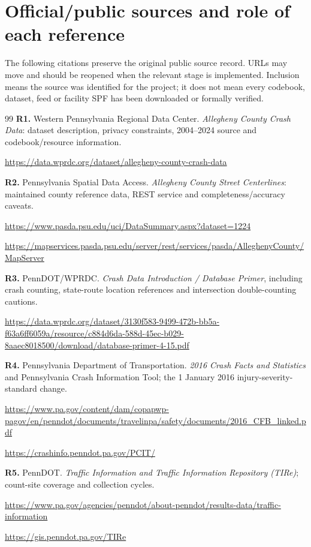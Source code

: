 \documentclass[11pt,a4paper,openany]{report}
\begin{document}
\section{Official/public sources and role of each reference}
The following citations preserve the original public source record. URLs may move and should be reopened when the relevant stage is implemented. Inclusion means the source was identified for the project; it does not mean every codebook, dataset, feed or facility SPF has been downloaded or formally verified.

\begin{thebibliography}{99}
\textbf{R1.} Western Pennsylvania Regional Data Center. \emph{Allegheny County Crash Data}: dataset description, privacy constraints, 2004--2024 source and codebook/resource information.\par\url{https://data.wprdc.org/dataset/allegheny-county-crash-data}

\textbf{R2.} Pennsylvania Spatial Data Access. \emph{Allegheny County Street Centerlines}: maintained county reference data, REST service and completeness/accuracy caveats.\par\url{https://www.pasda.psu.edu/uci/DataSummary.aspx?dataset=1224}\par\url{https://mapservices.pasda.psu.edu/server/rest/services/pasda/AlleghenyCounty/MapServer}

\textbf{R3.} PennDOT/WPRDC. \emph{Crash Data Introduction / Database Primer}, including crash counting, state-route location references and intersection double-counting cautions.\par\url{https://data.wprdc.org/dataset/3130f583-9499-472b-bb5a-f63a6ff6059a/resource/c884d6da-588d-45ec-b029-8aaec8018500/download/database-primer-4-15.pdf}

\textbf{R4.} Pennsylvania Department of Transportation. \emph{2016 Crash Facts and Statistics} and Pennsylvania Crash Information Tool; the 1 January 2016 injury-severity-standard change.\par\url{https://www.pa.gov/content/dam/copapwp-pagov/en/penndot/documents/travelinpa/safety/documents/2016_CFB_linked.pdf}\par\url{https://crashinfo.penndot.pa.gov/PCIT/}

\textbf{R5.} PennDOT. \emph{Traffic Information and Traffic Information Repository (TIRe)}; count-site coverage and collection cycles.\par\url{https://www.pa.gov/agencies/penndot/about-penndot/results-data/traffic-information}\par\url{https://gis.penndot.pa.gov/TIRe}


\end{thebibliography}
\end{document}
